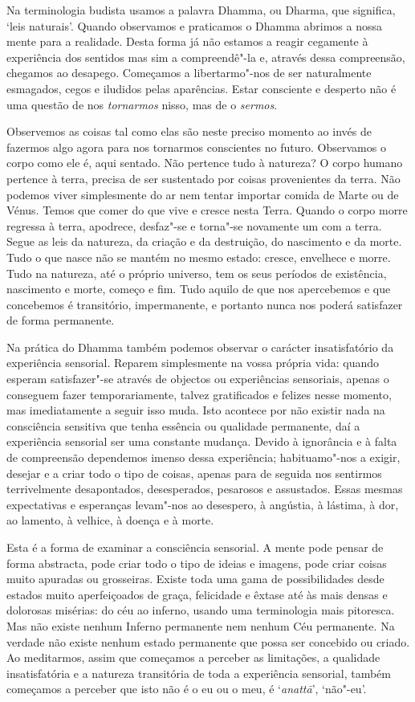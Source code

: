 Na terminologia budista usamos a palavra Dhamma, ou Dharma, que
significa, `leis naturais'. Quando observamos e praticamos o Dhamma
abrimos a nossa mente para a realidade. Desta forma já não estamos a
reagir cegamente à experiência dos sentidos mas sim a compreendê"-la e,
através dessa compreensão, chegamos ao desapego. Começamos a
libertarmo"-nos de ser naturalmente esmagados, cegos e iludidos pelas
aparências. Estar consciente e desperto não é uma questão de nos
\emph{tornarmos} nisso, mas de o \emph{sermos}.

Observemos as coisas tal como elas são neste preciso momento ao invés de
fazermos algo agora para nos tornarmos conscientes no futuro. Observamos
o corpo como ele é, aqui sentado. Não pertence tudo à natureza? O corpo
humano pertence à terra, precisa de ser sustentado por coisas
provenientes da terra. Não podemos viver simplesmente do ar nem tentar
importar comida de Marte ou de Vénus. Temos que comer do que vive e
cresce nesta Terra. Quando o corpo morre regressa à terra, apodrece,
desfaz"-se e torna"-se novamente um com a terra. Segue as leis da
natureza, da criação e da destruição, do nascimento e da morte. Tudo o
que nasce não se mantém no mesmo estado: cresce, envelhece e morre. Tudo
na natureza, até o próprio universo, tem os seus períodos de existência,
nascimento e morte, começo e fim. Tudo aquilo de que nos apercebemos e
que concebemos é transitório, impermanente, e portanto nunca nos poderá
satisfazer de forma permanente.

Na prática do Dhamma também podemos observar o carácter insatisfatório
da experiência sensorial. Reparem simplesmente na vossa própria vida:
quando esperam satisfazer"-se através de objectos ou experiências
sensoriais, apenas o conseguem fazer temporariamente, talvez
gratificados e felizes nesse momento, mas imediatamente a seguir isso
muda. Isto acontece por não existir nada na consciência sensitiva que
tenha essência ou qualidade permanente, daí a experiência sensorial ser
uma constante mudança. Devido à ignorância e à falta de compreensão
dependemos imenso dessa experiência; habituamo"-nos a exigir, desejar e a
criar todo o tipo de coisas, apenas para de seguida nos sentirmos
terrivelmente desapontados, desesperados, pesarosos e assustados. Essas
mesmas expectativas e esperanças levam"-nos ao desespero, à angústia, à
lástima, à dor, ao lamento, à velhice, à doença e à morte.

Esta é a forma de examinar a consciência sensorial. A mente pode pensar
de forma abstracta, pode criar todo o tipo de ideias e imagens, pode
criar coisas muito apuradas ou grosseiras. Existe toda uma gama de
possibilidades desde estados muito aperfeiçoados de graça, felicidade e
êxtase até às mais densas e dolorosas misérias: do céu ao inferno,
usando uma terminologia mais pitoresca. Mas não existe nenhum Inferno
permanente nem nenhum Céu permanente. Na verdade não existe nenhum
estado permanente que possa ser concebido ou criado. Ao meditarmos,
assim que começamos a perceber as limitações, a qualidade insatisfatória
e a natureza transitória de toda a experiência sensorial, também
começamos a perceber que isto não é o eu ou o meu, é `\emph{anattā}',
`não"-eu'.

